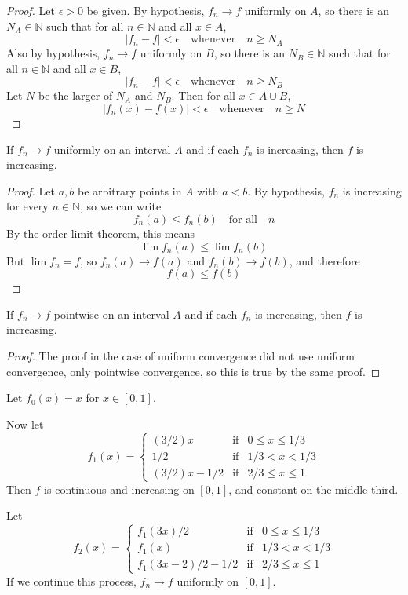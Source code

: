 \begin{proof}
Let $\epsilon>0$ be given.  By hypothesis, $f_n\rightarrow f$ uniformly on $A$, so there is an $N_A\in\mathbb{N}$ such that for all $n\in\mathbb{N}$ and all $x\in A$,
\[
|f_n-f|<\epsilon\quad\mbox{whenever}\quad n\geq N_A
\]
Also by hypothesis, $f_n\rightarrow f$ uniformly on $B$, so there is an $N_B\in\mathbb{N}$ such that for all $n\in\mathbb{N}$ and all $x\in B$,
\[
|f_n-f|<\epsilon\quad\mbox{whenever}\quad n\geq N_B
\]
Let $N$ be the larger of $N_A$ and $N_B$.  Then for all $x\in A\cup B$,
\[
|f_n(x)-f(x)| < \epsilon\quad\mbox{whenever}\quad n\geq N
\]
\end{proof}
\begin{conjecture*}
If $f_n\rightarrow f$ uniformly on an interval $A$ and if each $f_n$ is increasing, then $f$ is increasing.
\end{conjecture*}
\begin{proof}
Let $a,b$ be arbitrary points in $A$ with $a<b$.  By hypothesis, $f_n$ is increasing for every $n\in\mathbb{N}$, so we can write
\[
f_n(a) \leq f_n(b)\quad\mbox{for all}\quad n
\]
By the order limit theorem, this means
\[
\lim f_n(a) \leq \lim f_n(b)
\]
But $\lim f_n=f$, so $f_n(a)\rightarrow f(a)$ and $f_n(b)\rightarrow f(b)$, and therefore
\[
f(a) \leq f(b)
\]
\end{proof}
\begin{conjecture*}
If $f_n\rightarrow f$ pointwise on an interval $A$ and if each $f_n$ is increasing, then $f$ is increasing.
\end{conjecture*}
\begin{proof}
The proof in the case of uniform convergence did not use uniform convergence, only pointwise convergence, so this is true by the same proof.
\end{proof}
\begin{conjecture*}
Let $f_0(x)=x$ for $x\in[0,1]$.
\par\vspace{0.3 cm}
Now let
\[
f_1(x) =\left\{\begin{array}{lcl}
(3/2)x &\mbox{if}& 0\leq x\leq 1/3\\
1/2 &\mbox{if}& 1/3 < x < 1/3\\
(3/2)x-1/2 &\mbox{if}& 2/3\leq x\leq 1\end{array}\right.
\]
Then $f$ is continuous and increasing on $[0,1]$, and constant on the middle third.
\end{conjecture*}
\begin{conjecture*}
Let
\[
f_2(x) =\left\{\begin{array}{lcl}
f_1(3x)/2 &\mbox{if}& 0\leq x\leq 1/3\\
f_1(x) &\mbox{if}& 1/3 < x < 1/3\\
f_1(3x-2)/2-1/2 &\mbox{if}& 2/3\leq x\leq 1\end{array}\right.
\]
If we continue this process, $f_n\rightarrow f$ uniformly on $[0,1]$.
\end{conjecture*}

